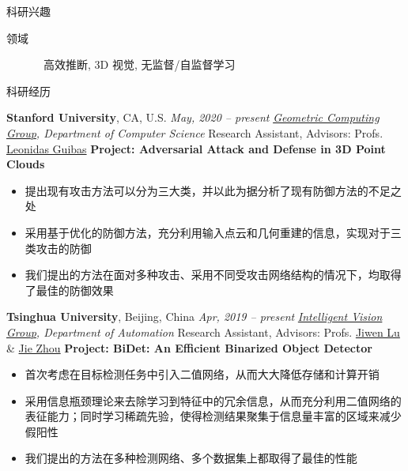 \documentclass{resume} %
\begin{document}
\begin{rSection}{科研兴趣}

\begin{description}
    \item[领域] \quad\quad\, 
    高效推断, 
    3D 视觉, %
    无监督/自监督学习
\end{description}

\end{rSection}

\begin{rSection}{科研经历}

{\textbf{Stanford University}, CA, U.S.} \hfill {\em May, 2020 -- present}\newline
\emph{\href{https://geometry.stanford.edu/}{Geometric Computing Group}, Department of Computer Science}\newline
Research Assistant, Advisors: Profs. \href{https://geometry.stanford.edu/member/guibas/index.html}{Leonidas Guibas}\newline
\textbf{Project: Adversarial Attack and Defense in 3D Point Clouds}
\begin{itemize}
    \item 提出现有攻击方法可以分为三大类，并以此为据分析了现有防御方法的不足之处
    \item 采用基于优化的防御方法，充分利用输入点云和几何重建的信息，实现对于三类攻击的防御
    \item 我们提出的方法在面对多种攻击、采用不同受攻击网络结构的情况下，均取得了最佳的防御效果\newline
\end{itemize}

{\textbf{Tsinghua University}, Beijing, China} \hfill {\em Apr, 2019 -- present}\newline
\emph{\href{http://ivg.au.tsinghua.edu.cn/index.php}{Intelligent Vision Group}, Department of Automation}\newline
Research Assistant, Advisors: Profs. \href{http://ivg.au.tsinghua.edu.cn/Jiwen_Lu/}{Jiwen Lu} \& \href{https://www.tsinghua.edu.cn/publish/auen/1713/2011/20110506105532098625469/20110506105532098625469_.html}{Jie Zhou}\newline
\textbf{Project: BiDet: An Efficient Binarized Object Detector}
\begin{itemize}
    \item 首次考虑在目标检测任务中引入二值网络，从而大大降低存储和计算开销
    \item 采用信息瓶颈理论来去除学习到特征中的冗余信息，从而充分利用二值网络的表征能力；同时学习稀疏先验，使得检测结果聚集于信息量丰富的区域来减少假阳性
    \item 我们提出的方法在多种检测网络、多个数据集上都取得了最佳的性能\newline
\end{itemize}


\end{rSection}
\end{document}
